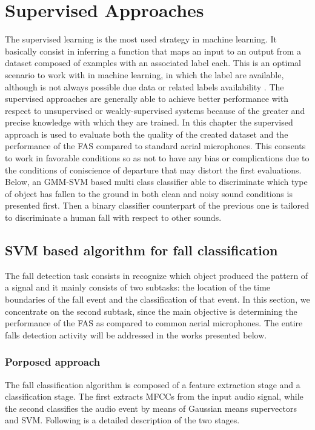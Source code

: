 \chapter{Supervised Approaches}
\label{ch:supervised_approaches}
The supervised learning is the most used strategy in machine learning. It basically consist in inferring a function that maps an input to an output from a dataset composed of examples with an associated label each. This is an optimal scenario to work with in machine learning, in which the label are available, although is not always possible due data or related labels availability . The supervised approaches are generally able to achieve better performance with respect to unsupervised or weakly-supervised systems because of the greater and precise knowledge with which they are trained. In this chapter the supervised approach is used to evaluate both the quality of the created dataset and the performance of the FAS compared to standard aerial microphones. This consents to work in favorable conditions so as not to have any bias or complications due to the conditions of coniscience of departure that may distort the first evaluations. Below, an GMM-SVM based multi class classifier able to discriminate which type of object has fallen to the ground in both clean and noisy sound conditions is presented first. Then a binary classifier counterpart of the previous one is tailored to discriminate a human fall with respect to other sounds.


\section{SVM based algorithm for fall classification}
\label{sec:algorithm_svm_multiclass}
The fall detection task consists in recognize which object produced the pattern of a signal and it mainly consists of two subtasks: the location of the time boundaries of the fall event and the classification of that event. In this section, we concentrate on the second subtask, since the main objective is determining the performance of the FAS as compared to common aerial microphones. The entire falls detection activity will be addressed in the works presented below.

\subsection{Porposed approach}
The fall classification algorithm is composed of a feature extraction stage and a classification stage. The first extracts MFCCs from the input audio signal, while the second classifies the audio event by means of Gaussian means supervectors and SVM. Following is a detailed description of the two stages.

